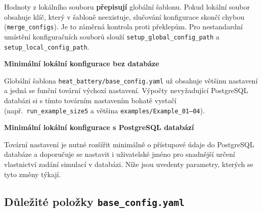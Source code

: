 \documentclass[a4paper,11pt]{article}
\begin{document}
Hodnoty z lokálního souboru \textbf{přepisují} globální šablonu. Pokud lokální
soubor obsahuje klíč, který v šabloně neexistuje, slučování konfigurace skončí
chybou (\texttt{merge\_configs}). Je to záměrná kontrola proti překlepům. Pro
nestandardní umístění konfiguračních souborů slouží
\texttt{setup\_global\_config\_path} a \texttt{setup\_local\_config\_path}.

\label{sec:config-minimal}
\begin{noteblock}
\textbf{Minimální lokální konfigurace bez databáze}

Globální šablona \texttt{heat\_battery/base\_config.yaml} už obsahuje většinu
nastavení a jedná se funční tovární výchoxí nastavení. Výpočty nevyžadující 
PostgreSQL databázi si s tímto továrním nastavením bohatě vystačí (např.\ \texttt{run\_example\_size5} a většina
\texttt{examples/Example\_01--04}).

\textbf{Minimální lokální konfigurace s PostgreSQL databází}

Tovární nastavení je nutné rozšířit minimálně o přístupové údaje do PostgreSQL
databáze a doporučuje se nastavit i uživatelské jméno pro snadnější určení
vlastnictví zadání simulací v databázi. Níže jsou uvedenty parametry,
kterých se tyto změny týkají.
\end{noteblock}

\label{sec:config-important}
\subsection*{Důležité položky \texttt{base\_config.yaml}}
\end{document}
